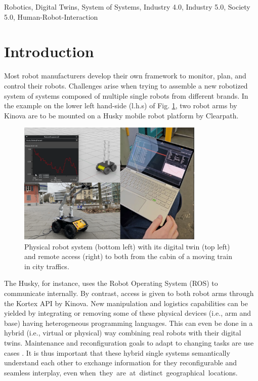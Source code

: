 \documentclass[conference]{IEEEtran}
\begin{document}
\begin{IEEEkeywords}
Robotics, Digital Twins, System of Systems, Industry 4.0, Industry 5.0, Society 5.0, Human-Robot-Interaction
\end{IEEEkeywords}

\section{Introduction}
Most robot manufacturers develop their own framework to monitor, plan, and control their robots. Challenges arise when trying to assemble a new robotized system of systems composed of multiple single robots from different brands.
In the example  on the lower left hand-side (l.h.s) of Fig. \ref{fig:TitelBild}, two robot arms by Kinova are to be mounted on a Husky mobile robot platform by Clearpath.
\begin{figure}[htbp]
    \centerline{\includegraphics[width=8.9cm]{Pictures/TitelBild.png}}
    \caption{Physical robot system (bottom left) with its digital twin (top left) and remote access (right) to both from the cabin of a moving train in city traffics.}
    \label{fig:TitelBild}
\end{figure}
The Husky, for instance, uses the Robot Operating System (ROS) to communicate internally. By contrast, access is given to both robot arms through the Kortex API by Kinova. New manipulation and logistics capabilities can be yielded by integrating or removing  some of these physical devices (i.e., arm and  base) having heterogeneous programming languages. This can even be done  in a hybrid (i.e., virtual or physical) way   combining real robots with  their digital twins.  Maintenance and reconfiguration goals  to adapt to changing tasks are  use cases \cite{mbakop2023integrated}. It is thus important that these hybrid  single systems  semantically understand each other to exchange information for they reconfigurable and seamless interplay, even \mbox{when they are  at distinct geographical locations.} 
\end{document}
